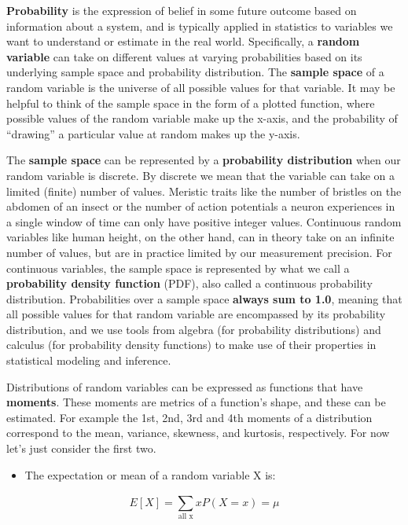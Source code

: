 \documentclass[]{book}
\providecommand{\tightlist}{%
  \setlength{\itemsep}{0pt}\setlength{\parskip}{0pt}}
\begin{document}
\textbf{Probability} is the expression of belief in some future outcome based on information about a system, and is typically applied in statistics to variables we want to understand or estimate in the real world. Specifically, a \textbf{random variable} can take on different values at varying probabilities based on its underlying sample space and probability distribution. The \textbf{sample space} of a random variable is the universe of all possible values for that variable. It may be helpful to think of the sample space in the form of a plotted function, where possible values of the random variable make up the x-axis, and the probability of ``drawing'' a particular value at random makes up the y-axis.

The \textbf{sample space} can be represented by a \textbf{probability distribution} when our random variable is discrete. By discrete we mean that the variable can take on a limited (finite) number of values. Meristic traits like the number of bristles on the abdomen of an insect or the number of action potentials a neuron experiences in a single window of time can only have positive integer values. Continuous random variables like human height, on the other hand, can in theory take on an infinite number of values, but are in practice limited by our measurement precision. For continuous variables, the sample space is represented by what we call a \textbf{probability density function} (PDF), also called a continuous probability distribution. Probabilities over a sample space \textbf{always sum to 1.0}, meaning that all possible values for that random variable are encompassed by its probability distribution, and we use tools from algebra (for probability distributions) and calculus (for probability density functions) to make use of their properties in statistical modeling and inference.

Distributions of random variables can be expressed as functions that have \textbf{moments}. These moments are metrics of a function's shape, and these can be estimated. For example the 1st, 2nd, 3rd and 4th moments of a distribution correspond to the mean, variance, skewness, and kurtosis, respectively. For now let's just consider the first two.

\begin{itemize}
\tightlist
\item
  The expectation or mean of a random variable X is:
\end{itemize}

\[E[X] = \sum_{\text{all x}}^{}xP(X=x) = \mu\]
\end{document}
